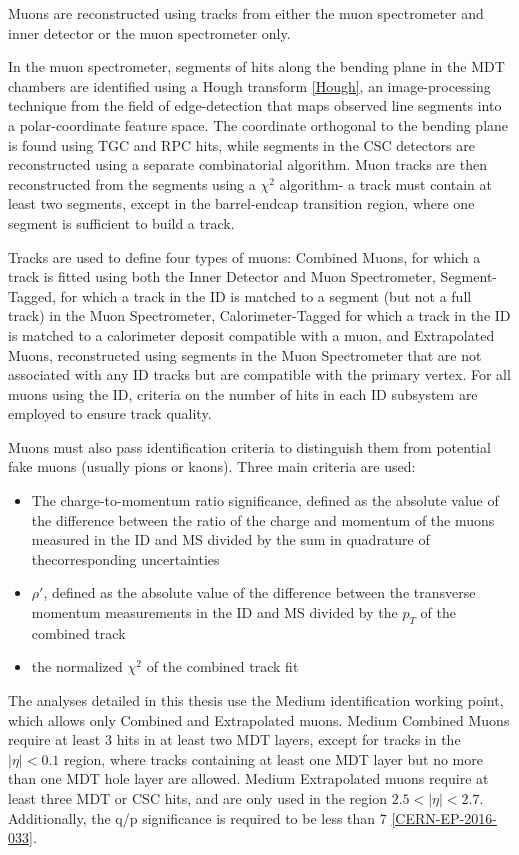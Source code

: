 Muons are reconstructed using tracks from either the muon spectrometer and inner detector or the muon spectrometer only.

In the muon spectrometer, segments of hits along the bending plane in the MDT chambers are identified using a Hough transform \ref{Hough}, an image-processing technique from the field of edge-detection that maps observed line segments into a polar-coordinate feature space. The coordinate orthogonal to the bending plane is found using TGC and RPC hits, while segments in the CSC detectors are reconstructed using a separate combinatorial algorithm. Muon tracks are then reconstructed from the segments using a $\chi^{2}$ algorithm- a track must contain at least two segments, except in the barrel-endcap transition region, where one segment is sufficient to build a track. 

Tracks are used to define four types of muons: Combined Muons, for which a track is fitted using both the Inner Detector and Muon Spectrometer, Segment-Tagged, for which a track in the ID is matched to a segment (but not a full track) in the Muon Spectrometer, Calorimeter-Tagged for which a track in the ID is matched to a calorimeter deposit compatible with a muon, and Extrapolated Muons, reconstructed using segments in the Muon Spectrometer that are not associated with any ID tracks but are compatible with the primary vertex. For all muons using the ID, criteria on the number of hits in each ID subsystem are employed to ensure track quality.

Muons must also pass identification criteria to distinguish them from potential fake muons (usually pions or kaons). Three main criteria are used:

\begin{itemize}
\item The charge-to-momentum ratio significance, defined as the absolute value of the difference between the ratio of the charge and momentum of the muons measured in the ID and MS divided by the sum in quadrature of thecorresponding uncertainties
\item $\rho'$, defined as the absolute value of the difference between the transverse momentum measurements in the ID and MS divided by the $p_{T}$ of the combined track
\item the normalized $\chi^{2}$ of the combined track fit
\end{itemize}

The analyses detailed in this thesis use the Medium identification working point, which allows only Combined and Extrapolated muons. Medium Combined Muons require at least 3 hits in at least two MDT layers, except for tracks in the $|\eta| <0.1$ region, where tracks containing at least one MDT layer but no more than one MDT hole layer are allowed. Medium Extrapolated muons require at least three MDT or CSC hits, and are only used in the region $2.5 < |\eta| < 2.7$. Additionally, the q/p significance is required to be less than 7 \ref{CERN-EP-2016-033}. 

